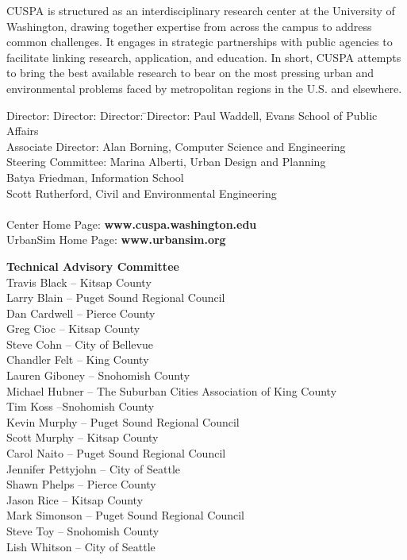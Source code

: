 CUSPA is structured as an interdisciplinary research center at the
University of Washington, drawing together expertise from across
the campus to address common challenges.  It engages in strategic
partnerships with public agencies to facilitate linking research,
application, and education.  In short, CUSPA attempts to bring the
best available research to bear on the most pressing urban and
environmental problems faced by metropolitan regions in the U.S.
and elsewhere.

\begin{tabbing}
Director: Director: Director: \= \kill Director:\> Paul Waddell,
Evans School of Public Affairs \\
Associate Director:\> Alan Borning, Computer Science and Engineering \\
Steering Committee:\> Marina Alberti, Urban Design and Planning \\
               \> Batya Friedman, Information School \\
\>Scott Rutherford, Civil and Environmental Engineering \\\\
Center Home Page: \> {\bf www.cuspa.washington.edu} \\
UrbanSim Home Page: \> {\bf www.urbansim.org}
\end{tabbing}

\newpage
{\bf \large Technical Advisory Committee} \\

Travis Black -- Kitsap County \\
Larry Blain -- Puget Sound Regional Council\\
Dan Cardwell -- Pierce County \\
Greg Cioc -- Kitsap County \\
Steve Cohn -- City of Bellevue \\
Chandler Felt -- King County \\
Lauren Giboney -- Snohomish County \\
Michael Hubner -- The Suburban Cities Association of King County \\
Tim Koss --Snohomish County \\
Kevin Murphy -- Puget Sound Regional Council\\
Scott Murphy -- Kitsap County \\
Carol Naito -- Puget Sound Regional Council\\
Jennifer Pettyjohn -- City of Seattle \\
Shawn Phelps -- Pierce County \\
Jason Rice -- Kitsap County \\
Mark Simonson -- Puget Sound Regional Council\\
Steve Toy -- Snohomish County \\
Lish Whitson -- City of Seattle \\
